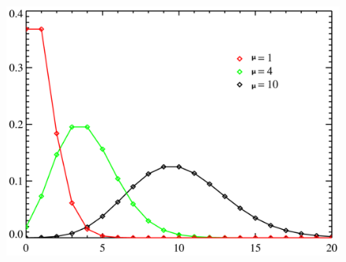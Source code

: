 \documentclass{beamer}
\begin{document}
\begin{frame}
  \begin{figure}
    \centering
    \includegraphics[height=0.9\textheight]{plot/poisson}
  \end{figure}
\end{frame}
\end{document}
